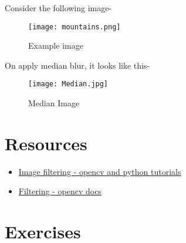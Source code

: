 \documentclass[]{article}
\providecommand{\tightlist}{%
  \setlength{\itemsep}{0pt}\setlength{\parskip}{0pt}}
\begin{document}
Consider the following image-

\begin{figure}[htbp]
\centering
\texttt{[image: mountains.png]}
\caption{Example image}
\end{figure}

On apply median blur, it looks like this-

\begin{figure}[htbp]
\centering
\texttt{[image: Median.jpg]}
\caption{Median Image}
\end{figure}

\newpage
\section{Resources}\label{resources}

\begin{itemize}
\tightlist
\item
  \href{http://opencv-python-tutroals.readthedocs.org/en/latest/py\_tutorials/py
  \_imgproc/py\_filtering/py\_filtering.html}{Image filtering - opencv and python tutorials}
\item
  \href{http://docs.opencv.org/modules/imgproc/doc/filtering.html\#}{Filtering - opencv docs}
\end{itemize}

\section{Exercises}\label{exercises}
\end{document}
